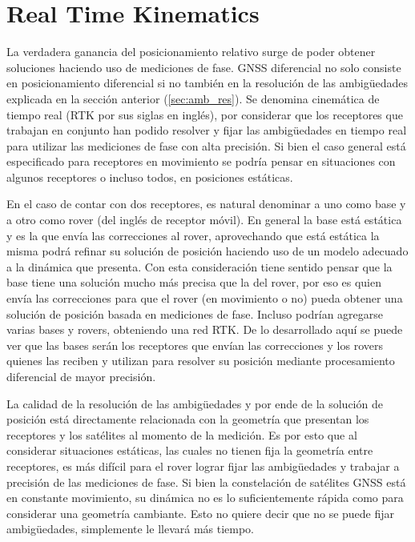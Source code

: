 \documentclass[a4paper,12pt,oneside,onecolumn,final,openright]{book}%
\begin{document}
\section{Real Time Kinematics}
	La verdadera ganancia del posicionamiento relativo surge de poder obtener soluciones haciendo uso de mediciones de fase. GNSS diferencial no solo consiste en posicionamiento diferencial si no también en la resolución de las ambigüedades explicada en la sección anterior (\ref{sec:amb_res}). Se denomina cinemática de tiempo real (RTK por sus siglas en inglés), por considerar que los receptores que trabajan en conjunto han podido resolver y fijar las ambigüedades en tiempo real para utilizar las mediciones de fase con alta precisión. Si bien el caso general está especificado para receptores en movimiento se podría pensar en situaciones con algunos receptores o incluso todos, en posiciones estáticas.

	En el caso de contar con dos receptores, es natural denominar a uno como base y a otro como rover (del inglés de receptor móvil). En general la base está estática y es la que envía las correcciones al rover, aprovechando que está estática la misma podrá refinar su solución de posición haciendo uso de un modelo adecuado a la dinámica que presenta. Con esta consideración tiene sentido pensar que la base tiene una solución mucho más precisa que la del rover, por eso es quien envía las correcciones para que el rover (en movimiento o no) pueda obtener una solución de posición basada en mediciones de fase. Incluso podrían agregarse varias bases y rovers, obteniendo una red RTK. De lo desarrollado aquí se puede ver que las bases serán los receptores que envían las correcciones y los rovers quienes las reciben y utilizan para resolver su posición mediante procesamiento diferencial de mayor precisión.

	La calidad de la resolución de las ambigüedades y por ende de la solución de posición está directamente relacionada con la geometría que presentan los receptores y los satélites al momento de la medición. Es por esto que al considerar situaciones estáticas, las cuales no tienen fija la geometría entre receptores, es más difícil para el rover lograr fijar las ambigüedades y trabajar a precisión de las mediciones de fase. Si bien la constelación de satélites GNSS está en constante movimiento, su dinámica no es lo suficientemente rápida como para considerar una geometría cambiante. Esto no quiere decir que no se puede fijar ambigüedades, simplemente le llevará más tiempo. 
\end{document}
